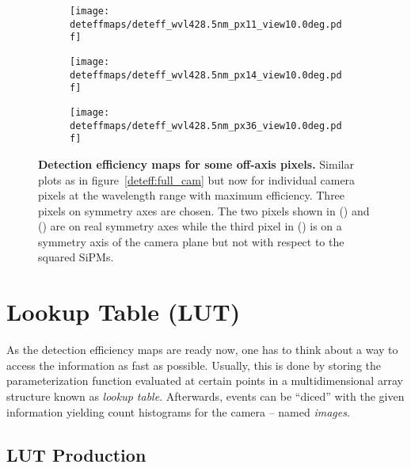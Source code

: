 \begin{figure}[H]
	\centering
	\begin{subfigure}[t]{0.705\textwidth}
		\texttt{[image: deteffmaps/deteff\_wvl428.5nm\_px11\_view10.0deg.pdf]}
		\label{deteff:offaxis_px:1}
	\end{subfigure}
	\hfill
	\begin{subfigure}[t]{0.705\textwidth}
		\texttt{[image: deteffmaps/deteff\_wvl428.5nm\_px14\_view10.0deg.pdf]}
		\label{deteff:offaxis_px:2}
	\end{subfigure}
	\vfill
	\begin{subfigure}[t]{0.705\textwidth}
		\texttt{[image: deteffmaps/deteff\_wvl428.5nm\_px36\_view10.0deg.pdf]}
		\label{deteff:offaxis_px:3}
	\end{subfigure}
	\caption[Detection efficiency maps for some off-axis pixels]{\textbf{Detection efficiency maps for some off-axis pixels.} Similar plots as in figure~\ref{deteff:full_cam} but now for individual camera pixels at the wavelength range with maximum efficiency. Three pixels on symmetry axes are chosen. The two pixels shown in () and () are on real symmetry axes while the third pixel in () is on a symmetry axis of the camera plane but not with respect to the squared SiPMs.}
	\label{deteff:offaxis_px}		
\end{figure}

\section{Lookup Table (LUT)}

As the detection efficiency maps are ready now, one has to think about a way to access the information as fast as possible. Usually, this is done by storing the parameterization function evaluated at certain points in a multidimensional array structure known as \textit{lookup table}. Afterwards, events can be \enquote{diced} with the given information yielding count histograms for the camera -- named \textit{images}.

\subsection{LUT Production}\label{sec:lut_production}

